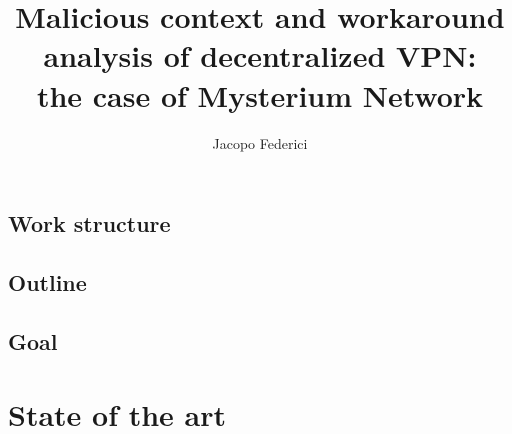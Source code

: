\documentclass[]{article}
\title{Malicious context and workaround analysis of decentralized VPN:\\the case of Mysterium Network}
\author{Jacopo Federici}
\begin{document}
	\raggedright
	\maketitle	
	\clearpage
	
	\tableofcontents{}
	\pagebreak

	\begin{abstract}
		
	\end{abstract}
	\pagebreak


	\subsection{Work structure}
	\subsection{Outline}
	\subsection{Goal}

	\section{State of the art}
\end{document}

